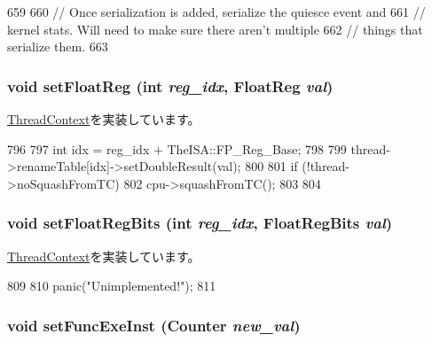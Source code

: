 \begin{DoxyCode}
659 {
660     // Once serialization is added, serialize the quiesce event and
661     // kernel stats.  Will need to make sure there aren't multiple
662     // things that serialize them.
663 }
\end{DoxyCode}
\hypertarget{classOzoneCPU_1_1OzoneTC_ab6fd8e55b81c173f448ec0c42bc28b99}{
\subsubsection[{setFloatReg}]{\setlength{\rightskip}{0pt plus 5cm}void setFloatReg (int {\em reg\_\-idx}, \/  {\bf FloatReg} {\em val})}}
\label{classOzoneCPU_1_1OzoneTC_ab6fd8e55b81c173f448ec0c42bc28b99}


\hyperlink{classThreadContext_af8dc9762fda519d911372dd6f4a28d8e}{ThreadContext}を実装しています。


\begin{DoxyCode}
796 {
797     int idx = reg_idx + TheISA::FP_Reg_Base;
798 
799     thread->renameTable[idx]->setDoubleResult(val);
800 
801     if (!thread->noSquashFromTC) {
802         cpu->squashFromTC();
803     }
804 }
\end{DoxyCode}
\hypertarget{classOzoneCPU_1_1OzoneTC_a618651078f08ecd328dfe3312f0f2ea7}{
\subsubsection[{setFloatRegBits}]{\setlength{\rightskip}{0pt plus 5cm}void setFloatRegBits (int {\em reg\_\-idx}, \/  {\bf FloatRegBits} {\em val})}}
\label{classOzoneCPU_1_1OzoneTC_a618651078f08ecd328dfe3312f0f2ea7}


\hyperlink{classThreadContext_a8f0c8b07cd1c4a6019a5b3922689d1db}{ThreadContext}を実装しています。


\begin{DoxyCode}
809 {
810     panic("Unimplemented!");
811 }
\end{DoxyCode}
\hypertarget{classOzoneCPU_1_1OzoneTC_aa1adc19bd2d6fd2ca03c47d5fd6561a2}{
\subsubsection[{setFuncExeInst}]{\setlength{\rightskip}{0pt plus 5cm}void setFuncExeInst ({\bf Counter} {\em new\_\-val})}}
\label{classOzoneCPU_1_1OzoneTC_aa1adc19bd2d6fd2ca03c47d5fd6561a2}



